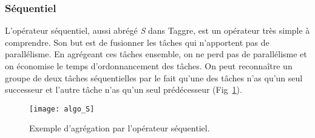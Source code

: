 \subsubsection{Séquentiel}
L'opérateur séquentiel, aussi abrégé {\em S} dans Taggre, est un opérateur très simple à comprendre.
%
Son but est de fusionner les tâches qui n'apportent pas de parallélisme.
%
En agrégeant ces tâches ensemble, on ne perd pas de parallélisme et on économise le temps d'ordonnancement des tâches.
%
On peut reconnaître un groupe de deux tâches séquentielles par le fait qu'une des tâches n'as qu'un seul successeur et l'autre tâche n'as qu'un seul prédécesseur (Fig~\ref{fig:algo_S}).
%
\begin{figure}[t!]
  \centering
  \texttt{[image: algo\_S]}
  \caption{Exemple d'agrégation par l'opérateur séquentiel.}
  \label{fig:algo_S}
\end{figure}
